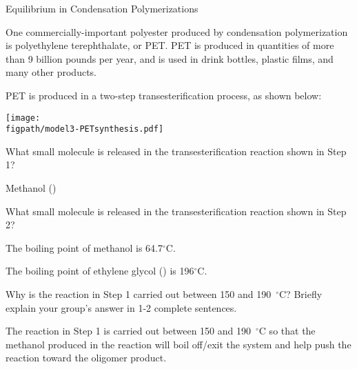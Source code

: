 \begin{activity}{Equilibrium in Condensation Polymerizations}
\begin{model}
One commercially-important polyester produced by condensation polymerization is polyethylene terephthalate, or PET.
PET is produced in quantities of more than 9 billion pounds per year, and is used in drink bottles, plastic films, and many other products.

PET is produced in a two-step transesterification process, as shown below:
	
		\vspace{0.1in}
		\centerline{\texttt{[image: \\figpath/model3-PETsynthesis.pdf]}}

\end{model}

\begin{ctqs}
		

			
		\question What small molecule is released in the transesterification reaction shown in Step 1?
		
			\begin{solution}[0.75in]
				Methanol ()
			\end{solution}
		
		\question What small molecule is released in the transesterification reaction shown in Step 2?
		
			\begin{solution}[0.75in]
			\end{solution}
			
\end{ctqs}

\begin{infobox}
	
	The boiling point of methanol is 64.7${}^\circ$C.
	
	The boiling point of ethylene glycol () is 196${}^\circ$C.
	
\end{infobox}

\begin{ctqs}
	
	\question Why is the reaction in Step 1 carried out between 150 and 190~${}^\circ$C?  Briefly explain your group's answer in 1-2 complete sentences.
	
		\begin{solution}[1.25in]
			The reaction in Step 1 is carried out between 150 and 190~${}^\circ$C so that the methanol produced in the reaction will boil off/exit the system and help push the reaction toward the oligomer product.
		\end{solution}
	

\end{ctqs}
\end{activity}
